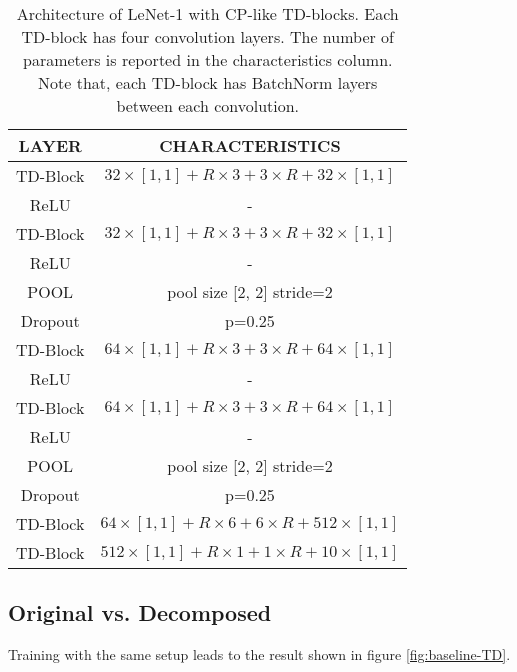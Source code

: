 \begin{table}[]
\centering
\begin{tabular}{|c|c|}
\hline
\textbf{LAYER} & \textbf{CHARACTERISTICS} \\ \hline
\rowcolor[HTML]{CBCEFB} 
TD-Block & $32 \times [1,1] + R \times 3 + 3 \times R + 32 \times [1,1] $ \\ \hline
\rowcolor[HTML]{EFEFEF} 
ReLU & - \\ \hline
\rowcolor[HTML]{CBCEFB} 
TD-Block & $32 \times [1,1] + R \times 3 + 3 \times R + 32 \times [1,1] $ \\ \hline
\rowcolor[HTML]{EFEFEF} 
ReLU & - \\ \hline
\rowcolor[HTML]{FFCCC9} 
POOL & pool size {[}2, 2{]} stride=2 \\ \hline
Dropout & p=0.25 \\ \hline
\rowcolor[HTML]{CBCEFB} 
TD-Block & $64 \times [1,1] + R \times 3 + 3 \times R + 64 \times [1,1] $ \\ \hline
\rowcolor[HTML]{EFEFEF} 
ReLU & - \\ \hline
\rowcolor[HTML]{CBCEFB} 
TD-Block & $64 \times [1,1] + R \times 3 + 3 \times R + 64 \times [1,1] $ \\ \hline
\rowcolor[HTML]{EFEFEF} 
ReLU & - \\ \hline
\rowcolor[HTML]{FFCCC9} 
POOL & pool size {[}2, 2{]} stride=2 \\ \hline
\rowcolor[HTML]{FFFFFF} 
Dropout & p=0.25 \\ \hline
\rowcolor[HTML]{FBF1A2} 
TD-Block & $64 \times [1,1] + R \times 6 + 6 \times R + 512 \times [1,1] $ \\ \hline
\rowcolor[HTML]{FBF1A2} 
TD-Block & $512 \times [1,1] + R \times 1 + 1 \times R + 10 \times [1,1] $ \\ \hline
\end{tabular}
\caption[LeNet-1 with TD-Block architecture]{Architecture of LeNet-1 with CP-like TD-blocks. Each TD-block has four convolution layers. The number of parameters is reported in the characteristics column. Note that, each TD-block has BatchNorm layers between each convolution. }
\label{tab:lenet1-cpd}
\end{table}

\subsection{Original vs. Decomposed}
Training with the same setup leads to the result shown in figure \ref{fig:baseline-TD}. 

